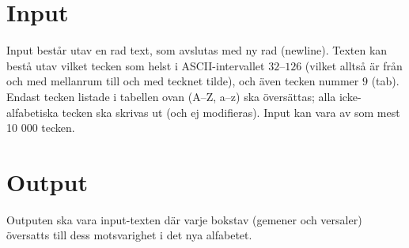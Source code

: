 \section*{Input}
Input består utav en rad text, som avslutas med ny rad (newline).
Texten kan bestå utav vilket tecken som helst i ASCII-intervallet $32$--$126$ (vilket alltså är från och med mellanrum till och med tecknet tilde), och även tecken nummer $9$ (tab).
Endast tecken listade i tabellen ovan (A--Z, a--z) ska översättas; alla icke-alfabetiska tecken ska skrivas ut (och ej modifieras).
Input kan vara av som mest 10 000 tecken.
\section*{Output}
Outputen ska vara input-texten där varje bokstav (gemener och versaler) översatts till dess motsvarighet i det nya alfabetet.
